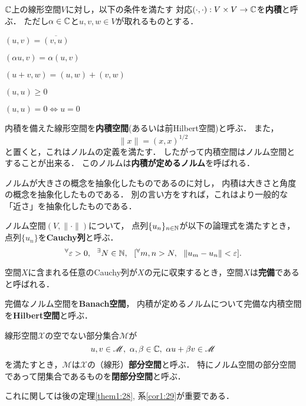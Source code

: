 \documentclass[a4j]{jsarticle}
\newcommand{\spX}{\mathscr{X}}
\begin{document}
        \begin{Def}
            $\mathbb{C}$上の線形空間$V$に対し，以下の条件を満たす
            対応$(\cdot, \cdot): V \times V \to \mathbb{C} $を\textbf{内積}と呼ぶ．
            ただし$\alpha \in \mathbb{C}$と$u, v, w \in V$が取れるものとする．
            \begin{description}
                \setlength{\leftskip}{0.5truecm}
                \item[I1] $(u,v)=\overline{(v,u)}$
                \item[I2] $(\alpha u, v) =\alpha (u,v)$
                \item[I4] $(u+v,w)=(u,w)+(v,w)$
                \item[I5] $(u,u) \geq 0$
                \item[I6] $(u,u)=0 \iff u=0$
            \end{description}
            内積を備えた線形空間を\textbf{内積空間}(あるいは前Hilbert空間)と呼ぶ．
            また，\[ \|x\|=(x,x)^{1/2} \]と置くと，これはノルムの定義を満たす．
            したがって内積空間はノルム空間とすることが出来る．
            このノルムは\textbf{内積が定めるノルム}を呼ばれる．
        \end{Def}
        ノルムが大きさの概念を抽象化したものであるのに対し，
        内積は大きさと角度の概念を抽象化したものである．
        別の言い方をすれば，これはより一般的な「近さ」を抽象化したものである．

        \begin{Def}
            ノルム空間$(V, \| \cdot \|)$について，
            点列$\{ u_n \}_{n \in \mathbb{N}}$が以下の論理式を満たすとき，
            点列$\{ u_n \}$を\textbf{Cauchy列}と呼ぶ．
            \[ {}^{\forall} \varepsilon>0,~~ {}^{\exists} N \in \mathbb{N},~~ [ {}^{\forall} m,n>N,~~ \| u_m-u_n \|<\varepsilon ]. \]
        \end{Def}

        \begin{Def}
            空間$X$に含まれる任意のCauchy列が$X$の元に収束するとき，空間$X$は\textbf{完備}であると呼ばれる．
        \end{Def}

        \begin{Def}
            完備なノルム空間を\textbf{Banach空間}，
            内積が定めるノルムについて完備な内積空間を\textbf{Hilbert空間}と呼ぶ．
        \end{Def}

        \begin{Def}
            線形空間$\spX$の空でない部分集合$\mathscr{M}$が
            \[ u, v \in \mathscr{M},~ \alpha, \beta \in \mathbb{C},~ \alpha u+ \beta v \in \mathscr{M} \]
            を満たすとき，$\mathscr{M}$は$\spX$の（線形）\textbf{部分空間}と呼ぶ．
            特にノルム空間の部分空間であって閉集合であるものを\textbf{閉部分空間}と呼ぶ．
        \end{Def}
        これに関しては後の定理\ref{them1:28}, 系\ref{cor1:29}が重要である．
\end{document}
